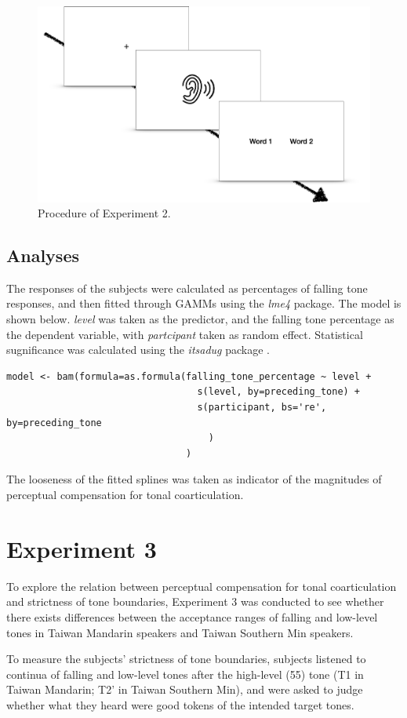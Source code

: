 \begin{figure}[h]
\centering
\includegraphics[width=.7\textwidth]{figures/E2/Procedure.png}
\caption{Procedure of Experiment 2.}
\label{Figure:Experiment2Procedure}
\end{figure}

\subsection{Analyses}
The responses of the subjects were calculated as percentages of falling tone responses, and then fitted through GAMMs using the \textit{lme4} package. The model is shown below. \textit{level} was taken as the predictor, and the falling tone percentage as the dependent variable, with \textit{partcipant} taken as random effect. Statistical sugnificance was calculated using the \textit{itsadug} package \citep{vanRijetal2020}.
\begin{lstlisting}
model <- bam(formula=as.formula(falling_tone_percentage ~ level + 
                                  s(level, by=preceding_tone) + 
                                  s(participant, bs='re', by=preceding_tone
                                    )
                                )
\end{lstlisting}
The looseness of the fitted splines was taken as indicator of the magnitudes of perceptual compensation for tonal coarticulation.

\section{Experiment 3}\label{section:Experiment3}
To explore the relation between perceptual compensation for tonal coarticulation and strictness of tone boundaries, Experiment 3 was conducted to see whether there exists differences between the acceptance ranges of falling and low-level tones in Taiwan Mandarin speakers and Taiwan Southern Min speakers.

To measure the subjects' strictness of tone boundaries, subjects listened to continua of falling and low-level tones after the high-level (55) tone (T1 in Taiwan Mandarin; T2' in Taiwan Southern Min), and were asked to judge whether what they heard were good tokens of the intended target tones.

